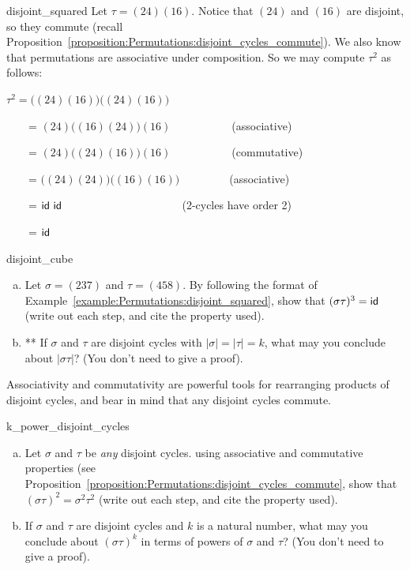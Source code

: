 \begin{example}{disjoint_squared}
Let $\tau = (2 4)(1 6).$ Notice that $(2 4)$ and $(1 6)$ are disjoint, so they commute (recall Proposition~\ref{proposition:Permutations:disjoint_cycles_commute}). We also know that permutations are associative under composition. So we may compute $\tau^2$ as follows:

\noindent
$\tau^2 = \Big( (2 4 )(1 6 ) \Big) \Big( (2 4 )(1 6 ) \Big)$
 
~~~~=  $(2 4) {\Big(} (1 6) (2 4 ) {\Big )} (1 6 )$~~~~~~~~~~~(associative) 

~~~~=  $(2 4 ) {\Big(} (2 4 ) (1 6)  {\Big )} (1 6 )$~~~~~~~~~~~(commutative) 

~~~~=  ${\Big(}  (2 4 ) (2 4 ) {\Big )} {\Big(}  (1 6) (1 6 ) {\Big )}$~~~~~~~~~(associative) 

~~~~=  ${\sf{i}d}~{\sf{i}d}$ ~~~~~~~~~~~~~~~~~~~~~(2-cycles have order 2) 

~~~~=  ${\sf{i}d}$   

\end{example}


\begin{exercise}{disjoint_cube}
\begin{enumerate}[(a)]
\item
Let $\sigma = (237)$ and $\tau = (458)$. By following the format of Example~\ref{example:Permutations:disjoint_squared}, show that $(\sigma \tau)^3 = {\sf{i}d} $ (write out each step, and cite the property used).
\item
** If $\sigma$ and $\tau$ are disjoint cycles with $|\sigma| = |\tau| = k$, what may you conclude about $| \sigma \tau |$? (You don't need to give a proof).
\end{enumerate}
\end{exercise}

\noindent
Associativity and commutativity are powerful tools for rearranging products of disjoint cycles, and bear in mind that any disjoint cycles commute.

\begin{exercise}{k_power_disjoint_cycles}
\begin{enumerate}[(a)]
\item
Let $\sigma$ and $\tau$ be \emph{any} disjoint cycles. using associative and commutative properties (see Proposition~\ref{proposition:Permutations:disjoint_cycles_commute}, show that $(\sigma \tau)^2 = \sigma^2 \tau^2$ (write out each step, and cite the property used).
\item
If $\sigma$ and $\tau$ are disjoint cycles and $k$ is a natural number, what may you conclude about $(\sigma \tau)^k$ in terms of powers of $\sigma$ and $\tau$? (You don't need to give a proof).
\end{enumerate}
\end{exercise}


